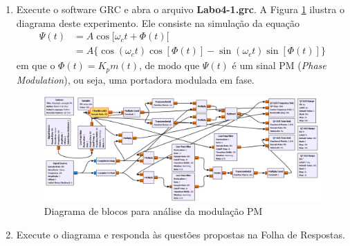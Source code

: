 \documentclass[12pt,addpoints]{exam}
\begin{document}
\begin{enumerate}   
    \item Execute o software GRC e abra o arquivo \textbf{Labo4-1.grc}. A Figura \ref{fig:GRC_4-1} ilustra o diagrama deste experimento. Ele consiste na simulação da equação 
\begin{align}
  \varPsi(t) &= A\cos[\omega_ct + \Phi(t)[\nonumber\\
   &= A\{\cos(\omega_ct) \cos[\Phi(t)] -  \sin(\omega_ct) \sin[\Phi(t)]\}
  \label{eq:pm}
\end{align}
em que o $\Phi(t) = K_pm(t)$, de modo que $\varPsi(t)$ é um sinal PM ({\it Phase Modulation}), ou seja, uma portadora modulada em fase.
    \begin{figure}[htb]
        \centering
        \includegraphics[width=0.95\linewidth]{./Figuras/Labo4-1.png}
        \caption{Diagrama de blocos para análise da modulação PM} 
        \label{fig:GRC_4-1}
    \end{figure}
  \item Execute o diagrama e responda às questões propostas na Folha de Respostas.
  \end{enumerate}
  

\end{document}

